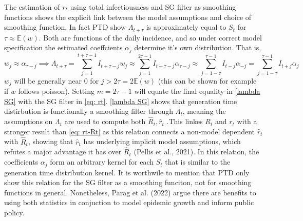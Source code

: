 \documentclass[12pt]{article}
\begin{document}
      The estimation of $r_t$ using total infectiousness and SG filter as smoothing functions shows the explicit link between
      the model assumptions and choice of smoothing function. In fact PTD show $\Lambda_{t+\tau}$ is approximately equal to $S_t$ 
      for $\tau \approx \mathbb{E}(w)$. Both are functions of the daily incidence, and so under correct model specification the
      estimated coeffcients $\alpha_j$ determine it's own distribution. That is,
      \begin{equation} \label{lambda SG}
        w_j \approx \alpha_{\tau - j} \implies 
        \Lambda_{t+\tau} = \sum_{j = 1}^{t + \tau - 1} I_{t + \tau - j}w_j  
        \approx \sum_{j = 1}^{2\tau - 1} I_{t + \tau - j}\alpha_{\tau -j}
        \approx \sum_{j = 1 - \tau}^{\tau - 1} I_{t - j} \alpha_{-j}
        = \sum_{j = 1 - \tau}^{\tau - 1} I_{t + j} \alpha_{j}
      \end{equation}
      $w_j$ will be generally near 0 for $j > 2\tau = 2\mathbb{E}(w)$ (this can be shown for example if $w$ follows poisson). 
      Setting $m = 2\tau - 1$ will equate the final equality in \cref{lambda SG} with the SG filter in \cref{eq: rt}.
      \cref{lambda SG} shows that generation time distirbution is functionally a smoothing filter through $\Lambda_t$, meaning
      the assumptions on $\Lambda_t$ are used to compute both $\hat{R}_t, \hat{r}_t$ .This linkes
      $R_t$ and $r_t$ with a stronger result than \cref{eq: rt-Rt} as this relation connects a non-model dependent $\hat{r}_t$ with $\hat{R}_t$, 
      showing that $\hat{r}_t$ has underlying implicit model assumptions, 
      which refutes a major advantage it has over $\hat{R}_t$ (Pellis et al., 2021). 
      In this relation, the coefficients $\alpha_j$ form an arbitrary kernel for each $S_t$ that is similar to the generation time
      distribution kernel. It is worthwile to mention that PTD only show this relation for the SG filter as a smoothing funciton, not for smoothing
      functions in general.
      Nonetheless, Parag et al. (2022) argue there are benefits to using both statistics in conjuction to 
      model epidemic growth and inform public policy. \\
\end{document}
